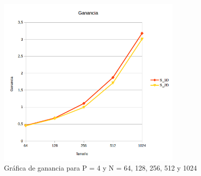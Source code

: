 \begin{figure}[H]
	\centering
	\includegraphics[width=9cm]{img/ganancia}
	\caption{Gráfica de ganancia para P = 4 y N = 64, 128, 256, 512 y 1024}
	\label{fig:grafica_ganancia}
\end{figure}

